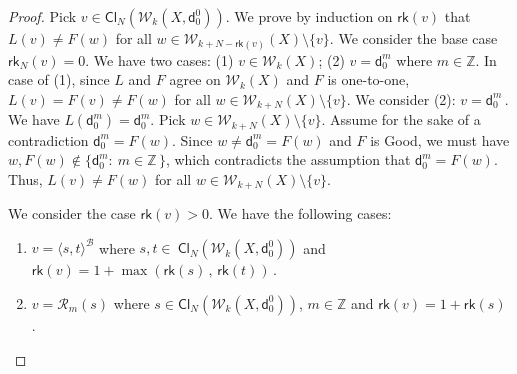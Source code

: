 \documentclass[10pt,a4paper]{amsart}
\begin{document}
\begin{proof}
 Pick   $   v  \in    \mathsf{Cl}_{N}  \left(  \mathcal{W}_{k}  \left( X    ,  \mathsf{d}^0_0    \right)   \right)   $. 
 We prove  by induction on  $  \mathsf{rk}   \left(  v  \right)  $  that  
 $  L(v)  \neq  F(w)  $  for all   $  w    \in \mathcal{W}_{k + N- \mathsf{rk}  \left( v  \right)  }  \left( X  \right)   \setminus  \lbrace  v  \rbrace  $. 
 We consider the base case   $   \mathsf{rk}_N  \left(  v  \right)  = 0  $. 
 We have two cases:   
 (1)  $  v    \in  \mathcal{W}_{k}  \left( X  \right)     $; 
 (2)  $  v  =  \mathsf{d}^m_0  $  where  $  m  \in  \mathbb{Z}  $. 
 In case of  (1),  since   $L$ and $F$ agree on   $   \mathcal{W}_{k}  \left( X  \right)     $ and  $F$  is one-to-one, 
  $  L(v)   =  F(v)   \neq    F(w)  $    for all   $  w    \in \mathcal{W}_{k + N }  \left( X  \right)   \setminus  \lbrace  v  \rbrace  $. 
   We consider (2):   $  v  =  \mathsf{d}^m_0     \,  $.
   We have  $  L(\mathsf{d}^m_0 )  =  \mathsf{d}^m_0   $. 
   Pick    $  w    \in \mathcal{W}_{k + N }  \left( X  \right)   \setminus  \lbrace  v  \rbrace  $. 
   Assume for the sake of a contradiction  $ \mathsf{d}^m_0   =  F(w)  $. 
   Since  $  w  \neq  \mathsf{d}^m_0   =  F(w)  $  and  $  F $  is  \textsf{Good},  
   we must have  $  w,  F(w)  \not\in    \big\{   \mathsf{d}^m_0  :   \    m  \in  \mathbb{Z}   \,   \big\}  $, 
   which contradicts the assumption that    $  \mathsf{d}^m_0   =  F(w)  $. 
   Thus,     $  L(v)   \neq    F(w)  $    for all   $  w    \in \mathcal{W}_{k + N }  \left( X  \right)   \setminus  \lbrace  v  \rbrace  $. 

   
   
   
   
   
We consider the case      $   \mathsf{rk}  \left(  v  \right)   >  0  $. 
We   have the following cases: 
 \begin{enumerate}
\item  $  v  =  \langle  s,  t  \rangle^{  \mathcal{B}  }  $  where  
$  s,  t  \in    \ \mathsf{Cl}_{N}  \left(  \mathcal{W}_{k}  \left( X   ,   \mathsf{d}^0_0    \right)   \right)   $
and  $  \mathsf{rk} \left(  v  \right)  =  1  +  \max\left(   \mathsf{rk} \left(  s \right)  \,  ,  \,    \mathsf{rk} \left(  t  \right)   \right)    \,   $. 




\item  $  v  =   \mathcal{R}_m \left(  s  \right)   $  where  
$  s  \in     \mathsf{Cl}_{N}  \left(  \mathcal{W}_{k}  \left( X    ,   \mathsf{d}^0_0    \right)   \right)   $, 
  $  m  \in  \mathbb{Z}  $
  and  $  \mathsf{rk} \left(  v  \right)  =  1  +  \mathsf{rk} \left(  s \right)      \,   $. 




\end{enumerate}
\end{proof}
\end{document}
